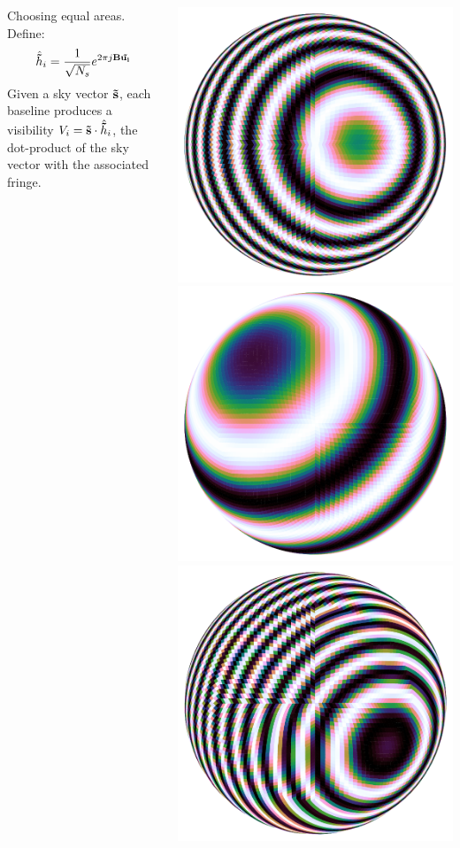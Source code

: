 \documentclass[ignorenonframetext]{beamer}
\begin{document}
\begin{frame}
\begin{columns}
 \begin{column}{0.5\linewidth}
Choosing equal areas. Define:
\[
\hat{\mathbf{\vec{h}}}_i = \frac{1}{\sqrt{N_s}} e^{2 \pi j \mathbf{B} \mathbf{\vec{u_i}}}
\]
Given a sky vector $\mathbf{\vec{s}}$, each baseline produces a visibility $V_i = \mathbf{\vec{s}} \cdot \hat{\mathbf{\vec{h}}}_i$, the dot-product of the sky vector with the associated fringe.
 \end{column}
 \begin{column}{0.5\linewidth}
\begin{center}
\includegraphics[width=0.45\linewidth]{fig/harmonic_uvw_0.pdf}
\includegraphics[width=0.45\linewidth]{fig/harmonic_uvw_1.pdf}\\
\includegraphics[width=0.45\linewidth]{fig/harmonic_uvw_2.pdf}

\end{center}
\end{column}
\end{columns}
\end{frame}
\end{document}
